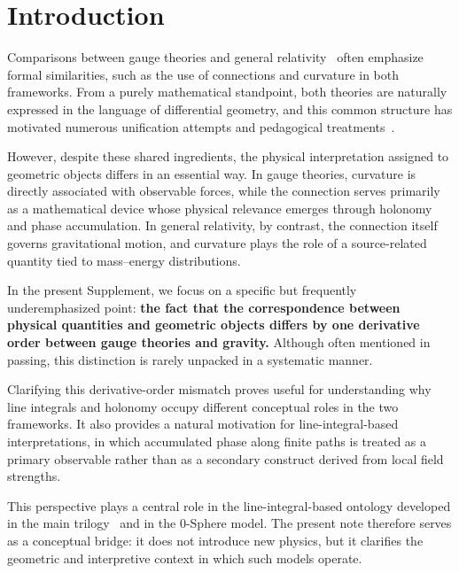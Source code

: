 \documentclass[12pt,letterpaper]{article}
\begin{document}
\section{Introduction}

\justifying
Comparisons between gauge theories and general relativity~\cite{EinsteinGR} often emphasize formal similarities, such as the use of connections and curvature in both frameworks. From a purely mathematical standpoint, both theories are naturally expressed in the language of differential geometry, and this common structure has motivated numerous unification attempts and pedagogical treatments~\cite{YangMills,Frankel,Nakahara}.

However, despite these shared ingredients, the physical interpretation assigned to geometric objects differs in an essential way. In gauge theories, curvature is directly associated with observable forces, while the connection serves primarily as a mathematical device whose physical relevance emerges through holonomy and phase accumulation. In general relativity, by contrast, the connection itself governs gravitational motion, and curvature plays the role of a source-related quantity tied to mass--energy distributions.

In the present Supplement, we focus on a specific but frequently underemphasized point: \textbf{the fact that the correspondence between physical quantities and geometric objects differs by one derivative order between gauge theories and gravity.} Although often mentioned in passing, this distinction is rarely unpacked in a systematic manner.

Clarifying this derivative-order mismatch proves useful for understanding why line integrals and holonomy occupy different conceptual roles in the two frameworks. It also provides a natural motivation for line-integral-based interpretations, in which accumulated phase along finite paths is treated as a primary observable rather than as a secondary construct derived from local field strengths.

This perspective plays a central role in the line-integral-based ontology developed in the main trilogy~\cite{hanamura18067760,hanamura18135855,hanamura18203433} and in the 0-Sphere model. The present note therefore serves as a conceptual bridge: it does not introduce new physics, but it clarifies the geometric and interpretive context in which such models operate.

\end{document}
